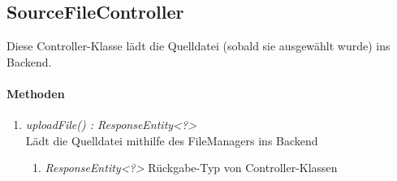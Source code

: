 \subsection{SourceFileController}
Diese Controller-Klasse lädt die Quelldatei (sobald sie ausgewählt wurde) ins Backend.

\paragraph{Methoden}

\begin{enumerate}[+]
	\item \textit{ uploadFile() : ResponseEntity<?>}\\
	 Lädt die Quelldatei mithilfe des FileManagers ins Backend
	
	\begin{enumerate}[$\circ$]
		\item \textit{ResponseEntity<?>} Rückgabe-Typ von Controller-Klassen
	\end{enumerate}

\end{enumerate}
